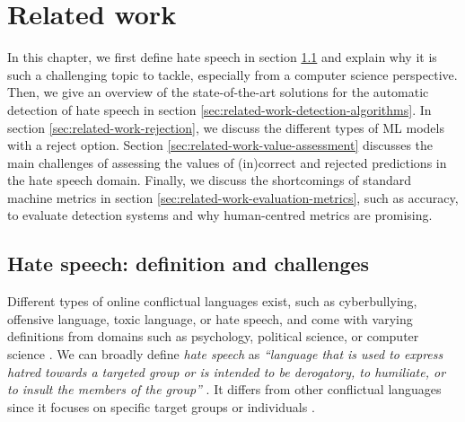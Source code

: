 \chapter{Related work}
In this chapter, we first define hate speech in section \ref{sec:related-work-challenges} and explain why it is such a challenging topic to tackle, especially from a computer science perspective.
%
Then, we give an overview of the state-of-the-art solutions for the automatic detection of hate speech in section \ref{sec:related-work-detection-algorithms}.
%
In section \ref{sec:related-work-rejection}, we discuss the different types of ML models with a reject option.
%
Section \ref{sec:related-work-value-assessment} discusses the main challenges of assessing the values of (in)correct and rejected predictions in the hate speech domain.
%
Finally, we discuss the shortcomings of standard machine metrics in section \ref{sec:related-work-evaluation-metrics}, such as accuracy, to evaluate detection systems and why human-centred metrics are promising.

\section{Hate speech: definition and challenges}
\label{sec:related-work-challenges}
Different types of online conflictual languages exist, such as cyberbullying, offensive language, toxic language, or hate speech, and come with varying definitions from domains such as psychology, political science, or computer science \citep{balayn2021automatic}.
%
We can broadly define \textit{hate speech} as \emph{``language that is used to express hatred towards a targeted group or is intended to be derogatory, to humiliate, or to insult the members of the group''} \citep{davidson2017automated, balayn2021automatic}.
%
It differs from other conflictual languages since it focuses on specific target groups or individuals \citep{balayn2021automatic}.
%
%

